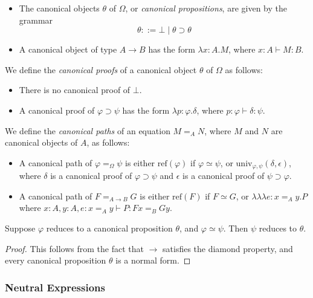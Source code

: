 \documentclass[a4paper,UKenglish]{lipics-v2016}
\newcommand*{\reff}[1]{\ensuremath{\mathrm{ref} \left( {#1} \right)}}
\newcommand*{\univ}[4]{\ensuremath{\mathrm{univ}_{{#1}, {#2}} \left({#3} , {#4} \right)}}
\newcommand*{\triplelambda}{\ensuremath{\lambda \!\! \lambda \!\! \lambda}}
\theoremstyle{plain}
\theoremstyle{definition}
\begin{document}
\begin{definition}
$ $
\begin{itemize}
\item
The canonical objects $\theta$ of $\Omega$, or \emph{canonical propositions}, are given by the grammar
\[ \theta ::= \bot \mid \theta \supset \theta \]
\item
A canonical object of type $A \rightarrow B$ has the form $\lambda x:A.M$, where
$x : A \vdash M : B$.
\end{itemize}
We define the \emph{canonical proofs} of a canonical object $\theta$ of $\Omega$ as follows:
\begin{itemize}
\item
There is no canonical proof of $\bot$.
\item
A canonical proof of $\varphi \supset \psi$ has the form $\lambda p : \varphi . \delta$, where $p : \varphi \vdash \delta : \psi$.
\end{itemize}
We define the \emph{canonical paths} of an equation $M =_A N$, where $M$ and $N$ are canonical objects of $A$, as follows:
\begin{itemize}
\item
A canonical path of $\varphi =_\Omega \psi$ is either $\reff{\varphi}$ if $\varphi \simeq \psi$, or $\univ{\varphi}{\psi}{\delta}{\epsilon}$, where $\delta$ is a canonical
proof of $\varphi \supset \psi$ and $\epsilon$ is a canonical proof of $\psi \supset \varphi$.
\item
A canonical path of $F =_{A \rightarrow B} G$ is either $\reff{F}$ if $F \simeq G$, or $\triplelambda e:x =_A y.P$ where $x : A, y : A, e : x =_A y \vdash P : Fx =_B Gy$.
\end{itemize}
\end{definition}

\begin{lemma}
\label{lm:compat-beta}
Suppose $\varphi$ reduces to a canonical proposition $\theta$, and $\varphi \simeq \psi$.  Then $\psi$ reduces to $\theta$.
\end{lemma}

\begin{proof}
This follows from the fact that $\rightarrow$ satisfies the diamond property, and every canonical proposition $\theta$ is a normal form.
\end{proof}

\subsubsection{Neutral Expressions}
\end{document}
